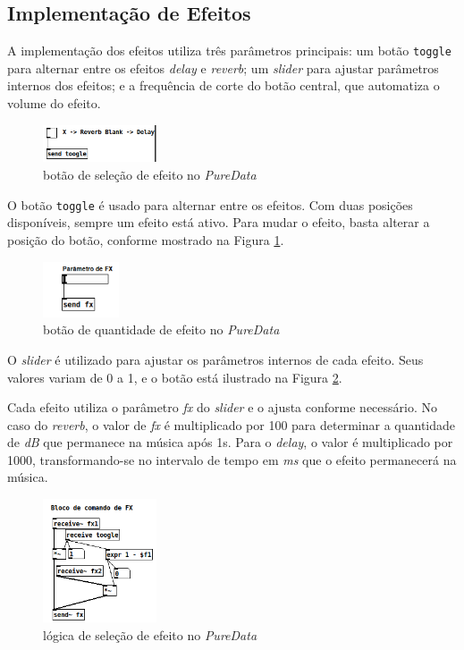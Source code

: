 \newpage
\subsection{Implementação de Efeitos}

A implementação dos efeitos utiliza três parâmetros principais: um botão \texttt{toggle} para alternar entre os efeitos \textit{delay} e \textit{reverb}; um \textit{slider} para ajustar parâmetros internos dos efeitos; e a frequência de corte do botão central, que automatiza o volume do efeito.

\begin{figure}[h]
    \centering
    \includegraphics[width=0.3\textwidth]{figuras/fig46.png}
    \caption{botão de seleção de efeito no \textit{PureData}}
    \label{fig46}
\end{figure}

O botão \texttt{toggle} é usado para alternar entre os efeitos. Com duas posições disponíveis, sempre um efeito está ativo. Para mudar o efeito, basta alterar a posição do botão, conforme mostrado na Figura \ref{fig46}.

\begin{figure}[h]
    \centering
    \includegraphics[width=0.2\textwidth]{figuras/fig47.png}
    \caption{botão de quantidade de efeito no \textit{PureData}}
    \label{fig47}
\end{figure}

O \textit{slider} é utilizado para ajustar os parâmetros internos de cada efeito. Seus valores variam de 0 a 1, e o botão está ilustrado na Figura \ref{fig47}.

Cada efeito utiliza o parâmetro \textit{fx} do \textit{slider} e o ajusta conforme necessário. No caso do \textit{reverb}, o valor de \textit{fx} é multiplicado por 100 para determinar a quantidade de \textit{dB} que permanece na música após 1s. Para o \textit{delay}, o valor é multiplicado por 1000, transformando-se no intervalo de tempo em \textit{ms} que o efeito permanecerá na música.

\begin{figure}[h]
    \centering
    \includegraphics[width=0.3\textwidth]{figuras/fig48.png}
    \caption{lógica de seleção de efeito no \textit{PureData}}
    \label{fig48}
\end{figure}


